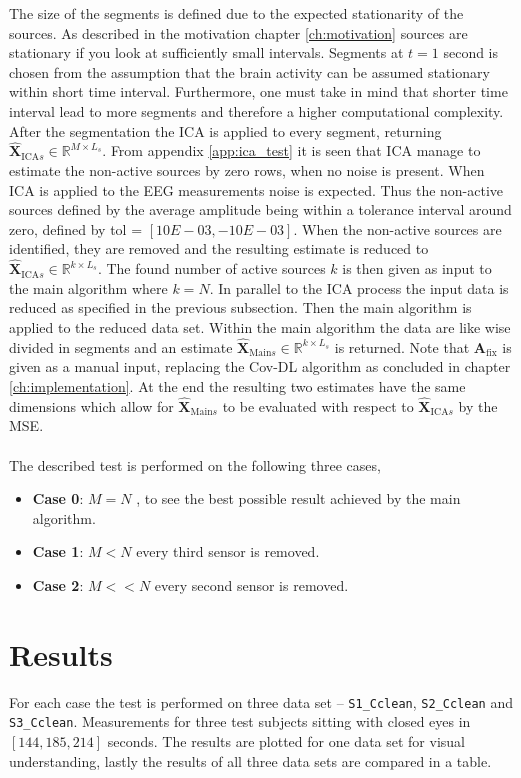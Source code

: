 The size of the segments is defined due to the expected stationarity of the sources. 
As described in the motivation chapter \ref{ch:motivation} sources are stationary if you look at sufficiently small intervals. 
Segments at $t = 1$ second is chosen from the assumption that the brain activity can be assumed stationary within short time interval.
Furthermore, one must take in mind that shorter time interval lead to more segments and therefore a higher computational complexity. 
After the segmentation the ICA is applied to every segment, returning $\hat{\textbf{X}}_{\text{ICA} s} \in \mathbb{R}^{M \times L_s}$.
From appendix \ref{app:ica_test} it is seen that ICA manage to estimate the non-active sources by zero rows, when no noise is present. 
When ICA is applied to the EEG measurements noise is expected. 
Thus the non-active sources defined by the average amplitude being within a tolerance interval around zero, defined by tol = $[10E-03, -10E-03]$. 
When the non-active sources are identified, they are removed and the resulting estimate is reduced to $\hat{\textbf{X}}_{\text{ICA} s} \in \mathbb{R}^{k \times L_s}$. 
The found number of active sources $k$ is then given as input to the main algorithm where $k = N$. 
In parallel to the ICA process the input data is reduced as specified in the previous subsection. 
Then the main algorithm is applied to the reduced data set. 
Within the main algorithm the data are like wise divided in segments and an estimate $\hat{\textbf{X}}_{\text{Main} s} \in \mathbb{R}^{k \times L_s}$ is returned. 
Note that $\textbf{A}_{\text{fix}}$ is given as a manual input, replacing the Cov-DL algorithm as concluded in chapter \ref{ch:implementation}.
At the end the resulting two estimates have the same dimensions which allow for $\hat{\textbf{X}}_{\text{Main} s}$ to be evaluated with respect to $\hat{\textbf{X}}_{\text{ICA} s}$ by the MSE. 
\\ \\
The described test is performed on the following three cases,
\begin{itemize}
\item \textbf{Case 0}: $M = N$ , to see the best possible result achieved by the main algorithm. 
\item \textbf{Case 1}: $M < N$ every third sensor is removed. 
\item \textbf{Case 2}: $M << N$ every second sensor is removed.
\end{itemize}

\section{Results}
For each case the test is performed on three data set -- \texttt{S1\_Cclean}, \texttt{S2\_Cclean} and \texttt{S3\_Cclean}. Measurements for three test subjects sitting with closed eyes in $[144, 185, 214]$ seconds.
The results are plotted for one data set for visual understanding, lastly the results of all three data sets are compared in a table.  


